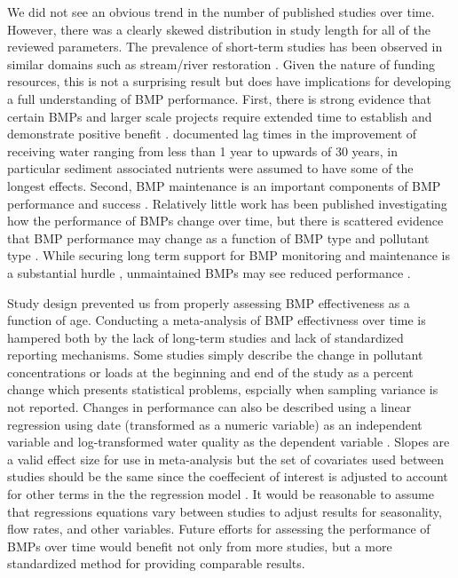 \documentclass[utf8]{FrontiersinHarvard}
\begin{document}
We did not see an obvious trend in the number of published studies over time.
However, there was a clearly skewed distribution in study length for all of the reviewed parameters.
The prevalence of short-term studies has been observed in similar domains such as stream/river restoration \citep{bernhardtSynthesizingRiverRestoration2005}.
Given the nature of funding resources, this is not a surprising result but does have implications for developing a full understanding of BMP performance.
First, there is strong evidence that certain BMPs and larger scale projects require extended time to establish and demonstrate positive benefit \citep{mealsLagTimeWater2010, grudzinskiDoesRiparianFencing2020}.
\citet{mealsLagTimeWater2010} documented lag times in the improvement of receiving water ranging from less than 1 year to upwards of 30 years, in particular sediment associated nutrients were assumed to have some of the longest effects.
Second, BMP maintenance is an important components of BMP performance and success \citep{kochNitrogenRemovalStormwater2014, heidariGreenStormwaterInfrastructure2023}.
Relatively little work has been published investigating how the performance of BMPs change over time, but there is scattered evidence that BMP performance may change as a function of BMP type and pollutant type \citep{liuReviewEffectivenessBest2017}.
While securing long term support for BMP monitoring and maintenance is a substantial hurdle \citep{heidariGreenStormwaterInfrastructure2023}, unmaintained BMPs may see reduced performance \citep{kochNitrogenRemovalStormwater2014, liuReviewEffectivenessBest2017}.

Study design prevented us from properly assessing BMP effectiveness as a function of age.
Conducting a meta-analysis of BMP effectivness over time is hampered both by the lack of long-term studies and lack of standardized reporting mechanisms.
Some studies simply describe the change in pollutant concentrations or loads at the beginning and end of the study as a percent change \citep{haileHydraulicPerformancePollutant2016} which presents statistical problems, espcially when sampling variance is not reported.
Changes in performance can also be described using a linear regression using date (transformed as a numeric variable) as an independent variable and log-transformed water quality as the dependent variable \citep{mitschCreatingWetlandsPrimary2012, mitschValidationEcosystemServices2014, pausAssessmentHydraulicToxic2014}.
Slopes are a valid effect size for use in meta-analysis but the set of covariates used between studies should be the same since the coeffecient of interest is adjusted to account for other terms in the the regression model \citep{beckerSynthesisRegressionSlopes2007}.
It would be reasonable to assume that regressions equations vary between studies to adjust results for seasonality, flow rates, and other variables.
Future efforts for assessing the performance of BMPs over time would benefit not only from more studies, but a more standardized method for providing comparable results.
\end{document}
